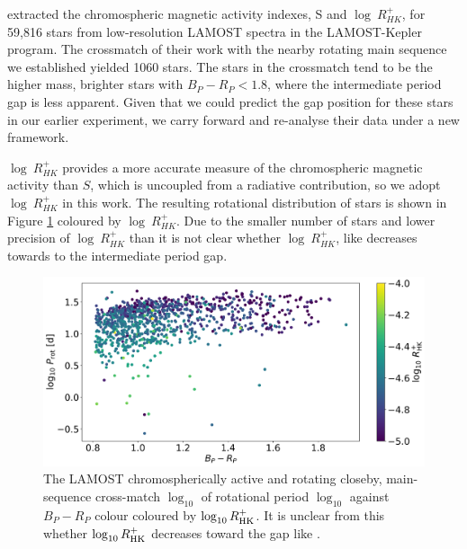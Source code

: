 \citet{zhang_magnetic_2020} extracted the chromospheric magnetic activity indexes, S and $\log \ R^{+}_{HK}$, for 59,816 stars from low-resolution LAMOST spectra in the LAMOST-Kepler program.
The crossmatch of their work with the nearby rotating main sequence we established yielded 1060 stars.
The stars in the crossmatch tend to be the higher mass, brighter stars with $B_P-R_P<1.8$, where the intermediate period gap is less apparent.
Given that we could predict the gap position for these stars in our earlier experiment, we carry forward and re-analyse their data under a new framework.

$\log \ R^{+}_{HK}$ provides a more accurate measure of the chromospheric magnetic activity than $S$, which is uncoupled from a radiative contribution, so we adopt $\log \ R^{+}_{HK}$ in this work.
The resulting rotational distribution of stars is shown in Figure \ref{fig:rot_dist_rhk} coloured by $\log \ R^{+}_{HK}$.
Due to the smaller number of stars and lower precision of $\log \ R^{+}_{HK}$ than \rper{} it is not clear whether $\log \ R^{+}_{HK}$, like \rper{} decreases towards to the intermediate period gap.


\begin{figure}
\centering
  \includegraphics[width=\textwidth]{Figures/rot_gap_figures/rotational_dist_rhk.png}
  \caption[The LAMOST chromospherically active and \kepler{} rotating closeby, main-sequence cross-match $\log_{10}$ of rotational period $\log_{10}$ against \gaia $B_P-R_P$ colour coloured by $\log_{10}R^{+}_{\rm{HK}}$.]{
  The LAMOST chromospherically active and \kepler{} rotating closeby, main-sequence cross-match $\log_{10}$ of rotational period $\log_{10}$ against \gaia $B_P-R_P$ colour coloured by $\log_{10}R^{+}_{\rm{HK}}$. It is unclear from this whether $\log_{10}R^{+}_{\rm{HK}}$ decreases toward the gap like \rper{}.}
  \label{fig:rot_dist_rhk}
\end{figure}

